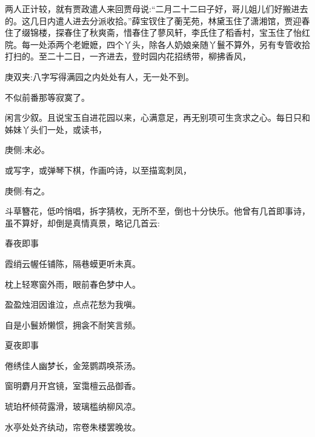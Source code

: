 \begin{parag}
    两人正计较，就有贾政遣人来回贾母说:“二月二十二曰子好，哥儿姐儿们好搬进去的。这几日内遣人进去分派收拾。”薛宝钗住了蘅芜苑，林黛玉住了潇湘馆，贾迎春住了缀锦楼，探春住了秋爽斋，惜春住了蓼风轩，李氏住了稻香村，宝玉住了怡红院。每一处添两个老嬷嬷，四个丫头，除各人奶娘亲随丫鬟不算外，另有专管收拾打扫的。至二十二日，一齐进去，登时园内花招绣带，柳拂香风，\begin{note}庚双夹:八字写得满园之内处处有人，无一处不到。\end{note}不似前番那等寂寞了。
\end{parag}


\begin{parag}
    闲言少叙。且说宝玉自进花园以来，心满意足，再无别项可生贪求之心。每日只和姊妹丫头们一处，或读书，\begin{note}庚侧:末必。\end{note}或写字，或弹琴下棋，作画吟诗，以至描鸾刺凤，\begin{note}庚侧:有之。\end{note}斗草簪花，低吟悄唱，拆字猜枚，无所不至，倒也十分快乐。他曾有几首即事诗，虽不算好，却倒是真情真景，略记几首云:
\end{parag}


\begin{poem}
    \begin{pl}春夜即事\end{pl}

    \begin{pl}霞绡云幄任铺陈，隔巷蟆更听未真。\end{pl}

    \begin{pl}枕上轻寒窗外雨，眼前春色梦中人。\end{pl}

    \begin{pl}盈盈烛泪因谁泣，点点花愁为我嗔。\end{pl}

    \begin{pl}自是小鬟娇懒惯，拥衾不耐笑言频。\end{pl}
\end{poem}


\begin{poem}
    \begin{pl}夏夜即事\end{pl}

    \begin{pl}倦绣佳人幽梦长，金笼鹦鹉唤茶汤。\end{pl}

    \begin{pl}窗明麝月开宫镜，室霭檀云品御香。\end{pl}

    \begin{pl}琥珀杯倾荷露滑，玻璃槛纳柳风凉。\end{pl}

    \begin{pl}水亭处处齐纨动，帘卷朱楼罢晚妆。\end{pl}

\end{poem}


